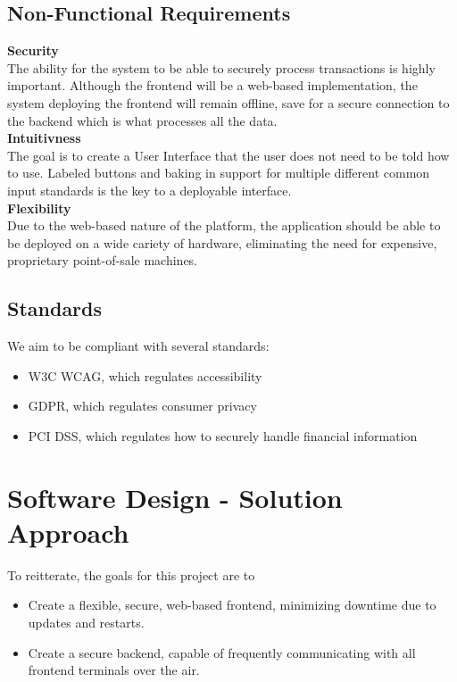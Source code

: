 \subsection{Non-Functional Requirements}

\textbf{Security}\\
The ability for the system to be able to securely process transactions is highly
important. Although the frontend will be a web-based implementation, 
the system deploying the frontend will
remain offline, save for a secure connection to the backend which is what processes all the data.\\
\textbf{Intuitivness}\\
The goal is to create a User Interface that the user does not need to be told
how to use. Labeled buttons and baking in support for multiple different common
input standards is the key to a deployable interface.\\
\textbf{Flexibility}\\
Due to the web-based nature of the platform, the application should be able to be
deployed on a wide cariety of hardware, eliminating the need for expensive, proprietary
point-of-sale machines.\\

\subsection{Standards}

We aim to be compliant with several standards:

\begin{itemize}
    \item W3C WCAG, which regulates accessibility
    \item GDPR, which regulates consumer privacy
    \item PCI DSS, which regulates how to securely handle financial information
\end{itemize}


\section{Software Design - Solution Approach}

To reitterate, the goals for this project are to\\
\begin{itemize}
\item Create a flexible, secure, web-based frontend, minimizing downtime due to updates and restarts.
\item Create a secure backend, capable of frequently communicating with all frontend terminals over the air. 
\end{itemize} 


